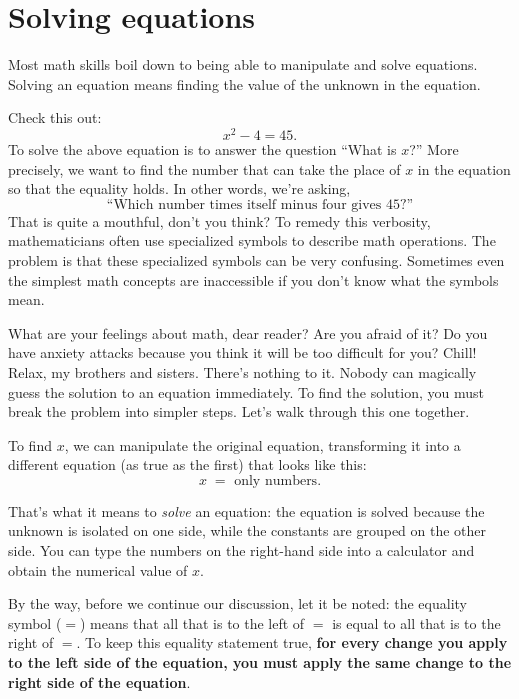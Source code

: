 \section{Solving equations}
\label{sec:solving_equations}
	
	Most math skills boil down to being able to manipulate and solve equations.
	Solving an equation means finding the value of the unknown in the equation.  

	Check this  out:
	\[
	 x^2-4=45.
	\]
	To solve the above equation is to answer
	the question ``What is $x$?''
	More precisely, we want to find the number that can take the 
	place of $x$ in the equation so that the equality holds.
	In other words, we're asking,
	\[
	  \text{``Which number times itself minus four gives 45?''}
	\]
	That is quite a mouthful, don't you think? 
	To remedy this verbosity, mathematicians often use specialized symbols to describe math operations.
	The problem is that these specialized symbols can be very confusing. 
	Sometimes even the simplest math concepts are inaccessible if you don't know what the symbols mean. 

	What are your feelings about math, dear reader? Are you afraid of it? 
	Do you have anxiety attacks because you think it will be too difficult for you?
	Chill! Relax, my brothers and sisters. There's nothing to it.
	Nobody can magically guess the solution to an equation immediately.
	To find the solution, you must break the problem into simpler steps.
	Let's walk through this one together.

	To find $x$, we can manipulate the original equation, 
	transforming it into a different equation (as true as the first) that looks like this:
	\[
	  x \; = \textrm{ only numbers.}
	\]

	\noindent
	That's what it means to \emph{solve} an equation:
	the equation is solved because the unknown is isolated on one side,
	while the constants are grouped on the other side.
	You can type the numbers on the right-hand side into a calculator and obtain the numerical value of $x$.

	By the way, before we continue our discussion,
	let it be noted: the equality symbol ($=$) means that all that is to the left of $=$ 
	is equal to 
	all that is to the right of $=$. 
	To keep this equality statement true,  
	\textbf{for every change you apply to the left side of the equation, 
	you must apply the same change to the right side of the equation}.

